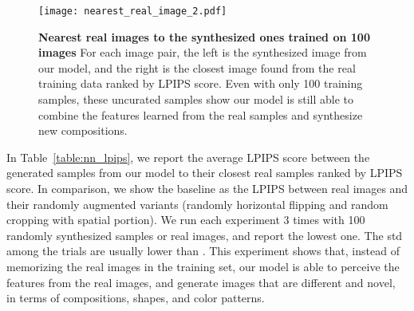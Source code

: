 \documentclass{article} \usepackage{iclr2021_conference,times}
\begin{document}
\begin{figure}[h]
\vspace{-2mm}
\centering
\texttt{[image: nearest\_real\_image\_2.pdf]}
\caption{\textbf{Nearest real images to the synthesized ones trained on 100 images} For each image pair, the left is the synthesized image from our model, and the right is the closest image found from the real training data ranked by LPIPS score. Even with only 100 training samples, these uncurated samples show our model is still able to combine the features learned from the real samples and synthesize new compositions.}
\label{fig:nr_1}
\end{figure}
\clearpage

\begin{table}[h]
\caption{LPIPS between synthetic images and their closest real images.}
\label{table:nn_lpips}
\begin{center}
\end{center}
\end{table}

In Table~\ref{table:nn_lpips}, we report the average LPIPS score between the generated samples from our model to their closest real samples ranked by LPIPS score. In comparison, we show the baseline as the LPIPS between real images and their randomly augmented variants (randomly horizontal flipping and random cropping with  spatial portion). We run each experiment 3 times with 100 randomly synthesized samples or real images, and report the lowest one. The std among the trials are usually lower than . This experiment shows that, instead of memorizing the real images in the training set, our model is able to perceive the features from the real images, and generate images that are different and novel, in terms of compositions, shapes, and color patterns. 
\clearpage
\end{document}

